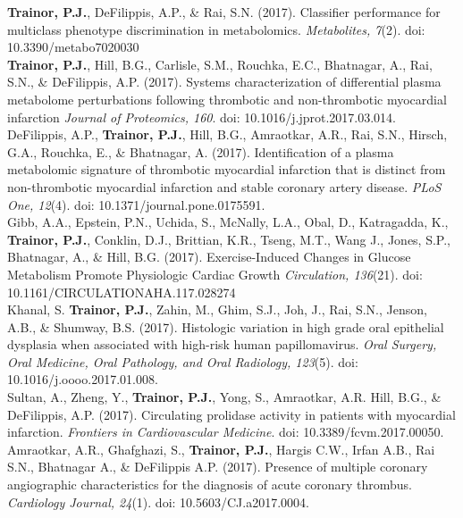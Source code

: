 \textbf{Trainor, P.J.}, DeFilippis, A.P., \& Rai, S.N. (2017). Classifier performance for multiclass phenotype discrimination in metabolomics. \emph{Metabolites, 7}(2). doi: 10.3390/metabo7020030 \\

\textbf{Trainor, P.J.}, Hill, B.G., Carlisle, S.M., Rouchka, E.C., Bhatnagar, A., Rai, S.N., \& DeFilippis, A.P. (2017). Systems characterization of differential plasma metabolome perturbations following thrombotic and non-thrombotic myocardial infarction \emph{Journal of Proteomics, 160}. doi: 10.1016/j.jprot.2017.03.014. \\

DeFilippis, A.P., \textbf{Trainor, P.J.}, Hill, B.G., Amraotkar, A.R., Rai, S.N., Hirsch, G.A., Rouchka, E., \& Bhatnagar, A. (2017). Identification of a plasma metabolomic signature of thrombotic myocardial infarction that is distinct from non-thrombotic myocardial infarction and stable coronary artery disease. \emph{PLoS One, 12}(4). doi: 10.1371/journal.pone.0175591. \\

Gibb, A.A., Epstein, P.N., Uchida, S., McNally, L.A., Obal, D., Katragadda, K., \textbf{Trainor, P.J.},  Conklin, D.J., Brittian, K.R., Tseng, M.T., Wang J., Jones, S.P., Bhatnagar, A., \& Hill, B.G. (2017). Exercise-Induced Changes in Glucose Metabolism Promote Physiologic Cardiac Growth \emph{Circulation, 136}(21). doi: 10.1161/CIRCULATIONAHA.117.028274 \\

Khanal, S. \textbf{Trainor, P.J.}, Zahin, M., Ghim, S.J., Joh, J., Rai, S.N., Jenson, A.B., \& Shumway, B.S. (2017). Histologic variation in high grade oral epithelial dysplasia when
associated with high-risk human papillomavirus.  \emph{Oral Surgery, Oral Medicine, Oral Pathology, and Oral Radiology, 123}(5). doi: 10.1016/j.oooo.2017.01.008. \\

Sultan, A., Zheng, Y., \textbf{Trainor, P.J.}, Yong, S., Amraotkar, A.R.  Hill, B.G., \& DeFilippis, A.P. (2017). Circulating prolidase activity in patients with myocardial infarction. \emph{Frontiers in Cardiovascular Medicine}. doi: 10.3389/fcvm.2017.00050. \\

Amraotkar, A.R., Ghafghazi, S., \textbf{Trainor, P.J.}, Hargis C.W., Irfan A.B., Rai S.N., Bhatnagar A., \& DeFilippis A.P. (2017). Presence of multiple coronary angiographic characteristics for the diagnosis of acute coronary thrombus. \emph{Cardiology Journal, 24}(1). doi: 10.5603/CJ.a2017.0004. \\

